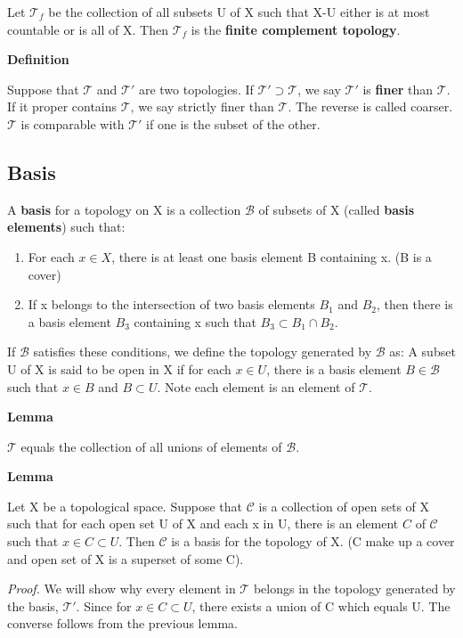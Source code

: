 \documentclass[11pt]{article}
\begin{document}
Let \(\mathcal{T}_f\) be the collection of all subsets U of X such that X-U either is at most countable or is all of X. Then \(\mathcal{T}_f\) is the \textbf{finite complement topology}.

\textbf{Definition}

Suppose that \(\mathcal{T}\) and \(\mathcal{T}'\) are two topologies. If \(\mathcal{T}' \supset \mathcal{T}\), we say \(\mathcal{T}'\) is \textbf{finer} than \(\mathcal{T}\). If it proper contains \(\mathcal{T}\), we say strictly finer than \(\mathcal{T}\). The reverse is called coarser. \(\mathcal{T}\) is comparable with \(\mathcal{T}'\) if one is the subset of the other.

\subsection{Basis}
\label{sec:orgbd1ee17}

A \textbf{basis} for a topology on X is a collection \(\mathcal{B}\) of subsets of X (called \textbf{basis elements}) such that:

\begin{enumerate}
\item For each \(x \in X\), there is at least one basis element B containing x. (B is a cover)
\item If x belongs to the intersection of two basis elements \(B_1\) and \(B_2\), then there is a basis element \(B_3\) containing x such that  \(B_3 \subset B_1 \cap B_2\).
\end{enumerate}

If \(\mathcal{B}\) satisfies these conditions, we define the topology generated by \(\mathcal{B}\) as: A subset U of X is said to be open in X if for each \(x \in U\), there is a basis element \(B \in \mathcal{B}\) such that \(x \in B\) and \(B \subset U\). Note each element is an element of \(\mathcal{T}\).

\textbf{Lemma}

\(\mathcal{T}\) equals the collection of all unions of elements of \(\mathcal{B}\).

\textbf{Lemma}

Let X be a topological space. Suppose that \(\mathcal{C}\) is a collection of open sets of X such that for each open set U of X and each x in U, there is an element \(C\) of \(\mathcal{C}\) such that \(x \in C \subset U\). Then \(\mathcal{C}\) is a basis for the topology of X. (C make up a cover and open set of X is a superset of some C).

\emph{Proof.} We will show why every element in \(\mathcal{T}\) belongs in the topology generated by the basis, \(\mathcal{T}'\). Since for \(x \in C \subset U\), there exists a union of C which equals U. The converse follows from the previous lemma.
\end{document}

